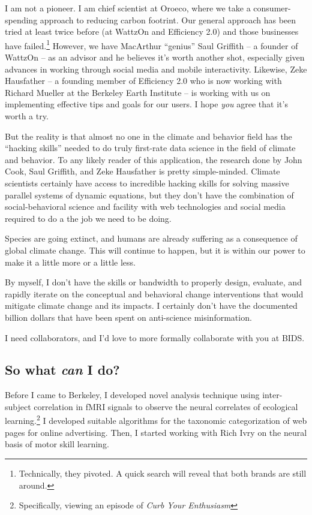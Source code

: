 \documentclass[12pt]{article}
\begin{document}
I am not a pioneer. I am chief scientist at Oroeco, where we take a
consumer-spending approach to reducing carbon footrint.  Our general approach
has been tried at least twice before (at WattzOn and Efficiency 2.0) and those
businesses have failed.\footnote{Technically, they pivoted. A quick search will
    reveal that both brands are still around.} However, we have MacArthur
“genius” Saul Griffith -- a founder of WattzOn -- as an advisor and he believes
it's worth another shot, especially given advances in working through social
media and mobile interactivity. Likewise, Zeke Hausfather -- a founding member
of Efficiency 2.0 who is now working with Richard Mueller at the Berkeley Earth
Institute -- is working with us on implementing effective tips and goals for our
users. I hope \emph{you} agree that it's worth a try.

But the reality is that almost no one in the climate and behavior field has the
“hacking skills” needed to do truly first-rate data science in the field of
climate and behavior. To any likely reader of this application, the research
done by John Cook, Saul Griffith, and Zeke Hausfather is pretty simple-minded.
Climate scientists certainly have access to incredible hacking skills for
solving massive parallel systems of dynamic equations, but they don't
have the combination of social-behavioral science and facility with
web technologies and social media required to do a the job we need to be doing.

Species are going extinct, %
and humans are already suffering as a consequence of global climate change. %
This will continue to happen, but it is within our power to make it a little
more or a little less.

By myself, I don't have the skills or bandwidth to properly design, evaluate, and rapidly
iterate on the conceptual and behavioral change interventions that would
mitigate climate change and its impacts. I certainly don't have the documented
billion dollars that have been spent on anti-science misinformation.

I need collaborators, and I'd love to more formally collaborate with you at BIDS.

\subsection*{So what \emph{can} I do?}

Before I came to Berkeley, I developed novel analysis technique using
inter-subject correlation in fMRI signals to observe the neural correlates of
ecological learning.\footnote{Specifically, viewing an episode of \emph{Curb
Your Enthusiasm}} I developed suitable algorithms for the taxonomic
categorization of web pages for online advertising. Then, I started working with
Rich Ivry on the neural basis of motor skill learning.
\end{document}
